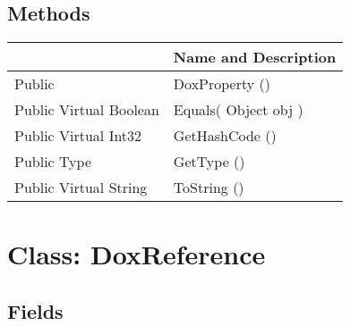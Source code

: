 \documentclass[11pt, oneside, a4paper]{book}
\begin{document}
\subsection{Methods}
\begin{center}
\begin{tabular}{| p{3cm} | p{12cm} | }
\hline
\textbf{ } & \textbf{ Name and Description}\\
\hline
 Public  &  DoxProperty ()\hypertarget{SoftwareEngineeringTools.{}Documentation.{}DoxProperty.{}DoxProperty}{}\\
\hline
 Public  Virtual  Boolean &  Equals(\hypertarget{SoftwareEngineeringTools.{}Documentation.{}DoxProperty.{}Equals\_Object}{} Object  obj  )\\
\hline
 Public  Virtual  Int32 &  GetHashCode ()\hypertarget{SoftwareEngineeringTools.{}Documentation.{}DoxProperty.{}GetHashCode}{}\\
\hline
 Public  Type &  GetType ()\hypertarget{SoftwareEngineeringTools.{}Documentation.{}DoxProperty.{}GetType}{}\\
\hline
 Public  Virtual  String &  ToString ()\hypertarget{SoftwareEngineeringTools.{}Documentation.{}DoxProperty.{}ToString}{}\\
\hline
\end{tabular}
\end{center}
 


\hypertarget{SoftwareEngineeringTools.{}Documentation.{}DoxReference}{}
\section{Class: DoxReference}

\subsection{Fields}
\end{document}
